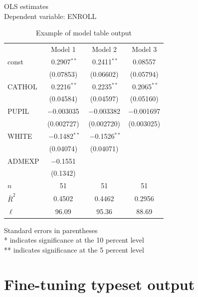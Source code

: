\begin{table}[htbp]
\caption{Example of model table output}
\label{tab:modeltab}
\begin{center}
OLS estimates\\
Dependent variable: ENROLL \\
\vspace{1em}

\begin{tabular}{lccc}
 & Model 1  & Model 2  & Model 3 \\  [6pt] 
const & $\,\,$0.2907$^{**}$ & $\,\,$0.2411$^{**}$ & 0.08557 \\
& \footnotesize{(0.07853)} & \footnotesize{(0.06602)} & \footnotesize{(0.05794)} \\ [4pt] 
CATHOL & $\,\,$0.2216$^{**}$ & $\,\,$0.2235$^{**}$ & $\,\,$0.2065$^{**}$ \\
& \footnotesize{(0.04584)} & \footnotesize{(0.04597)} & \footnotesize{(0.05160)} \\ [4pt] 
PUPIL & $-$0.003035 & $-$0.003382 & $-$0.001697 \\
& \footnotesize{(0.002727)} & \footnotesize{(0.002720)} & \footnotesize{(0.003025)} \\ [4pt] 
WHITE & $\,\,$$-$0.1482$^{**}$ & $\,\,$$-$0.1526$^{**}$ & \\
& \footnotesize{(0.04074)} & \footnotesize{(0.04071)} & \\ [4pt] 
ADMEXP & $-$0.1551 & & \\
& \footnotesize{(0.1342)} & & \\ [4pt] 
$n$ & 51 & 51 & 51 \\
$\bar R^2$ & 0.4502 & 0.4462 & 0.2956 \\
$\ell$ & 96.09 & 95.36 & 88.69 \\
\end{tabular}

\vspace{1em}
Standard errors in parentheses\\
{}* indicates significance at the 10 percent level\\
{}** indicates significance at the 5 percent level\\
\end{center}
\end{table}


\section{Fine-tuning typeset output}
\label{tex-tune}

